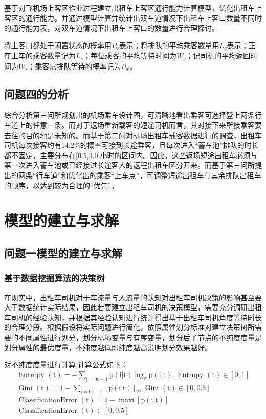 \documentclass[withoutpreface,bwprint]{cumcmthesis} %
\begin{document}
基于对飞机场上客区作业过程建立出租车上客区通行能力计算模型，优化出租车上客区的通行能力。并通过模型计算并统计出双车道情况下出租车上客口数量不同时的通行能力表，对双车道情况下出租车上客口的数量进行合理探讨。

将上客口都处于闲置状态的概率用$P_0$表示；将排队的平均乘客数量用$L_q$表示；正在上车的乘客数量记为$L_s$；每位乘客的平均等待时间为$W_q$；记司机的平均返回时间为$W_s$；乘客需排队等待的概率记为$P_w$。

\subsection{问题四的分析}
综合分析第三问所规划出的机场乘车设计图，可清晰地看出乘客可选择登上两条行车道上的任意一条。而对于返场重新载客的短途司机而言，其对接下来所接乘客要去往的目的地是未知的。而基于第二问对机场出租车载客数据进行的调查，出租车司机每次接客约有14.2$\%$的概率可接到长途乘客，且每次进入“蓄车池”排队的时长都不固定，主要分布在[0.5,3.0]小时的区间内。因此，这些返场短途出租车必须与第一次进入蓄车池或已经接过长途客人的返程出租车区分开来。而基于第三问所提出的两条“行车道”和优化出的乘客“上车点”，可调整短途出租车与其余排队出租车的顺序，以达到较为合理的“优先”。

\newpage
\section{模型的建立与求解}
\subsection{问题一模型的建立与求解}
\subsubsection{基于数据挖掘算法的决策树}
在现实中，出租车司机对于车流量与人流量的认知对出租车司机决策的影响甚至要大于数据统计实际结果，因此若要建立出租车司机的决策模型，需要充分调研出租车司机的经验认知，并根据其经验认知进行统计得出基于出租车司机角度等待时长的合理分段。根据假设将实际问题进行简化，依照属性划分标准对建立决策树所需要的不同属性进行划分，划分标称变量与有序变量，划分后子节点的不纯度度量是划分属性的最优度量，不纯度越低即纯度越高说明划分效果越好。

对不纯度度量进行计算,计算公式如下：
$$
\begin{array}{l}{\text { Entropy }(\mathrm{t})=-\sum_{\mathrm{j}=0 \mathrm{c}-1} \mathrm{p}(\mathrm{i} | \mathrm{t}) \log_{2}  \mathrm{p}(\mathrm{i} | \mathrm{t}), \text { Entropy }(\mathrm{t}) \in[0,1]} \\ {\text { Gini }(\mathrm{t})=1-\sum_{\mathrm{i}=0 \mathrm{c}-1}[\mathrm{p}(\mathrm{i} | \mathrm{t})]_{2}, \text { Gini }(\mathrm{t}) \in[0,0.5]} \\ {\text { ClassificationError }(\mathrm{t})=1-\operatorname{maxi}[\mathrm{p}(\mathrm{i} | \mathrm{t})]} \\ {\text { ClassificationError }(\mathrm{t}) \in[0,0.5]}\end{array}
$$
\end{document}
